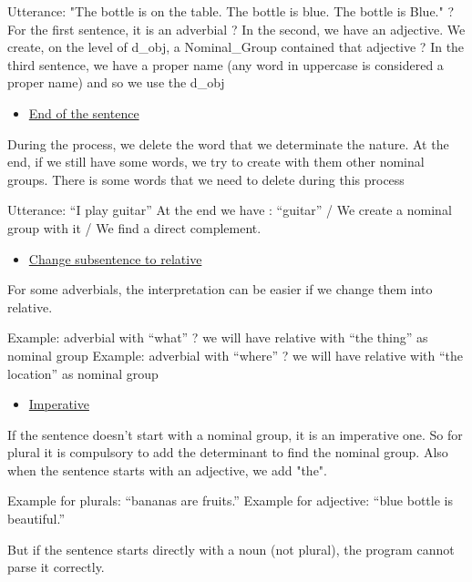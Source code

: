 \documentclass[twoside,a4paper,10pt]{report}
\begin{document}
\small
\begin{verbatimtab}
  Utterance: "The bottle is on the table. The bottle is blue. The bottle is Blue."
  ? For the first sentence, it is an adverbial
  ? In the second, we have an adjective. We create, on the level  of d_obj, a Nominal_Group
contained that adjective
  ? In the third sentence, we have a proper name (any word in uppercase is considered a proper name)
and so we use the d_obj
\end{verbatimtab}
\normalsize

\begin{itemize}
    \item  \underline{End of the sentence}
\end{itemize}
During the process, we delete the word that we determinate the nature. At the end, if we still have some words, we try to create with them other nominal groups. There is some words that we need to delete during this process


\small
\begin{verbatimtab}
  Utterance: “I play guitar”
  At the end we have : “guitar” / We create a nominal group with it / We find a direct
complement.
\end{verbatimtab}
\normalsize

\begin{itemize}
    \item  \underline{Change subsentence to relative}
\end{itemize}
For some adverbials, the interpretation can be easier if we change them into relative.


\small
\begin{verbatimtab}
  Example: adverbial with “what” ? we will have relative with “the thing” as nominal group
  Example: adverbial with “where” ? we will have relative with “the location” as nominal
group
\end{verbatimtab}
\normalsize

\begin{itemize}
    \item  \underline{Imperative}
\end{itemize}
If the sentence doesn’t start with a nominal group, it is an imperative one. So for plural it is compulsory to add the determinant to find the nominal group. Also when the sentence starts with an adjective, we add "the".


\small
\begin{verbatimtab}
  Example for plurals: “bananas are fruits.”
  Example for adjective: “blue bottle is beautiful.”
\end{verbatimtab}
\normalsize
But if the sentence starts directly with a noun (not plural), the program cannot parse it correctly.
\end{document}
